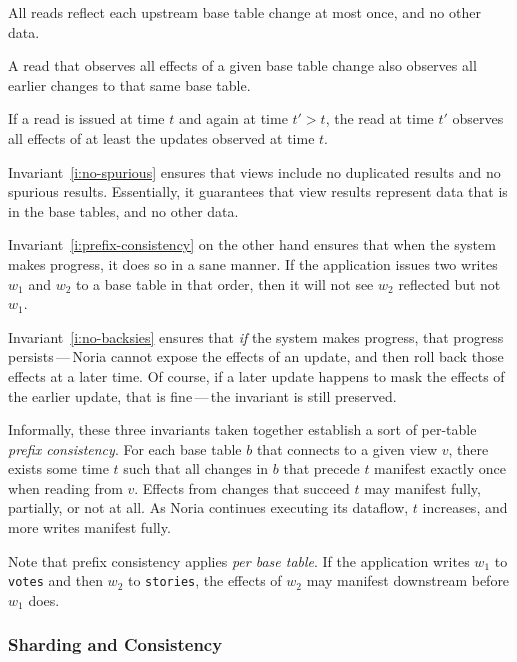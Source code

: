 \begin{invariant}
  \label{i:no-spurious}
  All reads reflect each upstream base table change at most once, and no other
  data.
\end{invariant}

\begin{invariant}
  \label{i:prefix-consistency}
  A read that observes all effects of a given base table change also observes
  all earlier changes to that same base table.
\end{invariant}

\begin{invariant}
  \label{i:no-backsies}
  If a read is issued at time $t$ and again at time $t' > t$, the read at time
  $t'$ observes all effects of at least the updates observed at time $t$.
\end{invariant}

Invariant~\ref{i:no-spurious} ensures that views include no duplicated results
and no spurious results. Essentially, it guarantees that view results represent
data that is in the base tables, and no other data.

Invariant~\ref{i:prefix-consistency} on the other hand ensures that when the
system makes progress, it does so in a sane manner. If the application issues
two writes $w_1$ and $w_2$ to a base table in that order, then it will not see
$w_2$ reflected but not $w_1$.

Invariant~\ref{i:no-backsies} ensures that \emph{if} the system makes progress,
that progress persists\,---\,Noria cannot expose the effects of an update, and
then roll back those effects at a later time. Of course, if a later update
happens to mask the effects of the earlier update, that is fine\,---\,the
invariant is still preserved.

Informally, these three invariants taken together establish a sort of per-table
\emph{prefix consistency}. For each base table $b$ that connects to a given view
$v$, there exists some time $t$ such that all changes in $b$ that precede $t$
manifest exactly once when reading from $v$. Effects from changes that succeed
$t$ may manifest fully, partially, or not at all. As Noria continues executing
its dataflow, $t$ increases, and more writes manifest fully.

Note that prefix consistency applies \emph{per base table}. If the application
writes $w_1$ to \texttt{votes} and then $w_2$ to \texttt{stories}, the effects
of $w_2$ may manifest downstream before $w_1$ does.

\subsubsection*{Sharding and Consistency}

